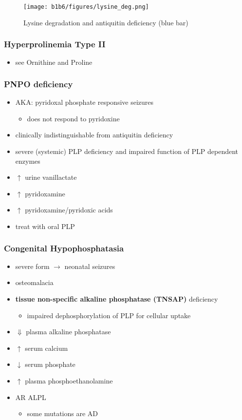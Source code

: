 \documentclass[12pt]{scrartcl}
\begin{document}
\begin{figure}[htbp]
\centering
\texttt{[image: b1b6/figures/lysine\_deg.png]}
\caption{\label{fig:org9a7404c}Lysine degradation and antiquitin deficiency (blue bar)}
\end{figure}

\subsubsection{Hyperprolinemia Type II}
\label{sec:org6e7257d}
\begin{itemize}
\item see Ornithine and Proline
\end{itemize}

\subsubsection{PNPO deficiency}
\label{sec:org2362b9f}
\begin{itemize}
\item AKA: pyridoxal phosphate responsive seizures
\begin{itemize}
\item does not respond to pyridoxine
\end{itemize}
\item clinically indistinguishable from antiquitin deficiency
\item severe (systemic) PLP deficiency and impaired function of PLP
dependent enzymes
\item \(\uparrow\) urine vanillactate
\item \(\uparrow\) pyridoxamine
\item \(\uparrow\) pyridoxamine/pyridoxic acids
\item treat with oral PLP
\end{itemize}

\subsubsection{Congenital Hypophosphatasia}
\label{sec:orgdcc4e35}
\begin{itemize}
\item severe form \(\to\) neonatal seizures
\item osteomalacia
\item \textbf{tissue non-specific alkaline phosphatase (TNSAP)} deficiency
\begin{itemize}
\item impaired dephosphorylation of PLP for cellular uptake
\end{itemize}
\item \(\Downarrow\) plasma alkaline phosphatase
\item \(\uparrow\) serum calcium
\item \(\downarrow\) serum phosphate
\item \(\uparrow\) plasma phosphoethanolamine
\item AR ALPL
\begin{itemize}
\item some mutations are AD
\end{itemize}
\end{itemize}
\end{document}
